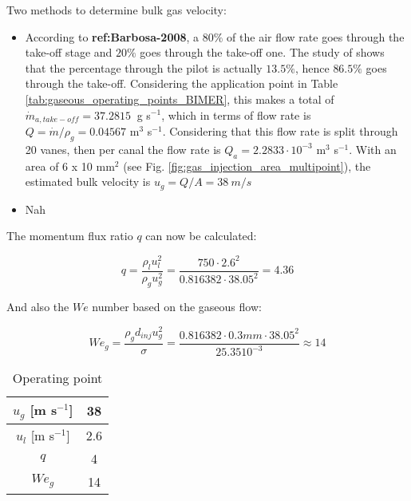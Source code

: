 Two methods to determine bulk gas velocity:

\begin{itemize}

	\item According to \textbf{ref:Barbosa-2008}, a $80 \%$ of the air flow rate goes through the take-off stage and $20 \%$ goes through the take-off one. The study of  shows that the percentage through the pilot is actually $13.5 \%$, hence $86.5 \%$ goes through the take-off. Considering the application point in Table \ref{tab:gaseous_operating_points_BIMER}, this makes a total of $\dot{m}_{a,take-off} = 37.2815 ~ $ g s$^{-1}$, which in terms of flow rate is $Q = \dot{m} / \rho_g = 0.04567 $ m$^{3}$ s$^{-1}$. Considering that this flow rate is split through 20 vanes, then per canal the flow rate is $Q_a = 2.2833 \cdot 10^{-3}$ m$^{3}$ s$^{-1}$. With an area of 6 x 10 mm$^2$ (see Fig. \ref{fig:gas_injection_area_multipoint}), the estimated bulk velocity is $u_g = Q / A = 38 ~ m/s$
	
	\item Nah

\end{itemize}

The momentum flux ratio $q$ can now be calculated:

\begin{equation}
q = \frac{\rho_l u_l^2}{\rho_g u_g^2} = \frac{750 \cdot 2.6^2}{0.816382 \cdot 38.05^2} = 4.36
\end{equation}

And also the $We$ number based on the gaseous flow:

\begin{equation}
We_g = \frac{\rho_g d_{inj} u_g^2}{\sigma} = \frac{0.816382 \cdot 0.3 mm \cdot 38.05^2}{25.35 10^{-3}} \approx 14
\end{equation}


\begin{table}[!h]
\centering
\caption{Operating point}
\begin{tabular}{|c|c|}
\hline
$u_g$ [m s$^{-1}$] &  38 \\
\hline
$u_l$ [m s$^{-1}$] &  2.6 \\
\hline
\hline
$q$ & 4 \\ %
\hline
$We_g$ & 14 \\
\hline
\end{tabular}
\label{tab:bimer_sps_operating_point}
\end{table}


